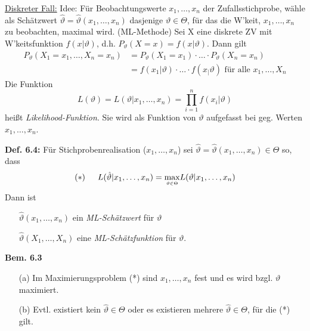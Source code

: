 \documentclass[a4paper,11pt]{article}
\begin{document}
\vspace{4pt}
\noindent\underline{Diskreter Fall:}
\newline Idee: Für Beobachtungswerte $x_1,\dots,x_n$ der Zufallsstichprobe, 
wähle als Schätzwert $\hat{\vartheta}=\hat{\vartheta}(x_1,\dots,x_n)$ dasjenige $\vartheta\in\Theta$, für das die W'keit, $x_1,\dots,x_n$ zu beobachten, maximal wird. (ML-Methode)
\newline Sei X eine diskrete ZV mit W'keitsfunktion $f(x|\vartheta)$, d.h. $P_\vartheta(X=x)=f(x|\vartheta)$.
\newline Dann gilt
\begin{align*}
P_\vartheta(X_1=x_1,\dots,X_n=x_n) &= P_\vartheta(X_1=x_1)\cdot\dots\cdot P_\vartheta(X_n=x_n)\\
&= f(x_1|\vartheta)\cdot\dots\cdot f(x_|\vartheta) \text{ für alle } x_1,\dots,X_n
\end{align*} 
Die Funktion
\[L(\vartheta)=L(\vartheta|x_1,\dots,x_n)=\prod_{i=1}^{n}f(x_i|\vartheta)\]
heißt \textit{Likelihood-Funktion}. Sie wird als Funktion von $\vartheta$ aufgefasst bei geg. Werten $x_1,\dots,x_n$.

\vspace{6pt}
\noindent\textbf{Def. 6.4:}
Für Stichprobenrealisation ($x_1,\dots,x_n$) sei $\hat{\vartheta}=\hat{\vartheta}(x_1,\dots,x_n)\in\Theta$ so, dass
\[(*)\hspace{15pt} L(\hat{\vartheta}|x_1,\dots,x_n)=\underset{\mathclap{\scriptscriptstyle \vartheta\in\Theta}}{\text{max}}L(\vartheta|x_1,\dots,x_n)\]
Dann ist 
\begin{itemize}
\item[] $\hat{\vartheta}(x_1,\dots,x_n)$ ein \textit{ML-Schätzwert} für $\vartheta$
\item[] $\hat{\vartheta}(X_1,\dots,X_n)$ eine \textit{ML-Schätzfunktion} für $\vartheta$. 
\end{itemize}

\vspace{6pt}
\noindent\textbf{Bem. 6.3}
\begin{itemize}
\item[(a)] Im Maximierungsproblem (*) sind $x_1,\dots,x_n$ fest und es wird bzgl. $\vartheta$ maximiert.
\item[(b)] Evtl. existiert kein $\hat{\vartheta}\in\Theta$ oder es existieren mehrere $\hat{\vartheta}\in\Theta$, für die (*) gilt. 
\end{itemize}
\end{document}
